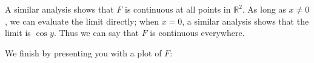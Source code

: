 \documentclass{ximera}
\begin{document}
\begin{example}
\begin{explanation}
    A similar analysis shows that $F$ is continuous at all points in
    $\mathbb{R}^2$. As long as $x\neq0$, we can evaluate the limit
    directly; when $x=0$, a similar analysis shows that the limit is $\cos
    y$. Thus we can say that $F$ is continuous everywhere.
    \begin{onlineOnly}
      We finish by presenting you with a plot of $F$:
      \begin{center}
      \end{center}
    \end{onlineOnly}
  \end{explanation}
\end{example}
\end{document}
